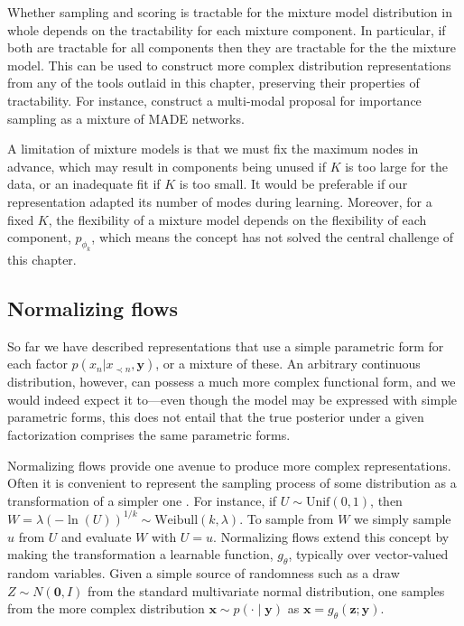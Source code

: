 Whether sampling and scoring is tractable for the mixture model distribution in whole depends on the tractability for each mixture component. In particular, if both are tractable for all components then they are tractable for the the mixture model. This can be used to construct more complex distribution representations from any of the tools outlaid in this chapter, preserving their properties of tractability. For instance, \citet{PaigeWood2016} construct a multi-modal proposal for importance sampling as a mixture of MADE networks.

A limitation of mixture models is that we must fix the maximum nodes in advance, which may result in components being unused if $K$ is too large for the data, or an inadequate fit if $K$ is too small. It would be preferable if our representation adapted its number of modes during learning. Moreover, for a fixed $K$, the flexibility of a mixture model depends on the flexibility of each component, $p_{\phi_k}$, which means the concept has not solved the central challenge of this chapter.

\subsection{Normalizing flows}\label{sec:normalizing-flows}
So far we have described representations that use a simple parametric form for each factor $p(x_n|x_{\prec n},\mathbf{y})$, or a mixture of these. An arbitrary continuous distribution, however, can possess a much more complex functional form, and we would indeed expect it to---even though the model may be expressed with simple parametric forms, this does not entail that the true posterior under a given factorization comprises the same parametric forms.

Normalizing flows provide one avenue to produce more complex representations. Often it is convenient to represent the sampling process of some distribution as a transformation of a simpler one \citep{tabak2013family, RezendeMohamed2015}. For instance, if $U\sim\text{Unif}(0,1)$, then $W=\lambda(-\ln(U))^{1/k}\sim\text{Weibull}(k,\lambda)$. To sample from $W$ we simply sample $u$ from $U$ and evaluate $W$ with $U=u$. Normalizing flows extend this concept by making the transformation a learnable function, $g_\theta$, typically over vector-valued random variables. Given a simple source of randomness such as a draw $Z\sim N(\mathbf{0},I)$ from the standard multivariate normal distribution, one samples from the more complex distribution $\mathbf{x}\sim p(\cdot\mid\mathbf{y})$ as $\mathbf{x}=g_\theta(\mathbf{z}; \mathbf{y})$.

